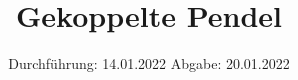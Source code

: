 

\subject{VERSUCH 106}
\title{Gekoppelte Pendel}
\date{%
  Durchführung: 14.01.2022
  \hspace{3em}
  Abgabe: 20.01.2022
}



\maketitle
\thispagestyle{empty}
\tableofcontents
\newpage







\printbibliography{}


